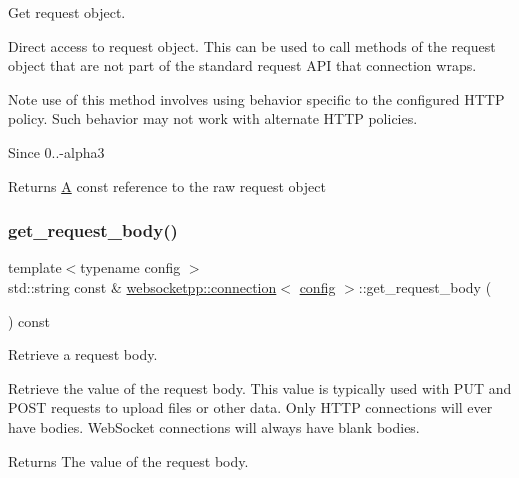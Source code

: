 Get request object. 

Direct access to request object. This can be used to call methods of the request object that are not part of the standard request A\+PI that connection wraps.

Note use of this method involves using behavior specific to the configured H\+T\+TP policy. Such behavior may not work with alternate H\+T\+TP policies.

\begin{DoxySince}{Since}
0..-\/alpha3
\end{DoxySince}
\begin{DoxyReturn}{Returns}
\mbox{\hyperlink{struct_a}{A}} const reference to the raw request object 
\end{DoxyReturn}
\mbox{\label{classwebsocketpp_1_1connection_a187c640f1352e74a00c0f8b6177da94a}} 
\subsubsection{\texorpdfstring{get\+\_\+request\+\_\+body()}{get\_request\_body()}}
{\footnotesize\ttfamily template$<$typename config $>$ \\
std\+::string const  \& \mbox{\hyperlink{classwebsocketpp_1_1connection}{websocketpp\+::connection}}$<$ \mbox{\hyperlink{classconfig}{config}} $>$\+::get\+\_\+request\+\_\+body (\begin{DoxyParamCaption}{ }\end{DoxyParamCaption}) const}



Retrieve a request body. 

Retrieve the value of the request body. This value is typically used with P\+UT and P\+O\+ST requests to upload files or other data. Only H\+T\+TP connections will ever have bodies. Web\+Socket connection\textquotesingle{}s will always have blank bodies.

\begin{DoxyReturn}{Returns}
The value of the request body. 
\end{DoxyReturn}
\mbox{\label{classwebsocketpp_1_1connection_a542dd013907c3aeb2dbb01d1d631a492}} 
